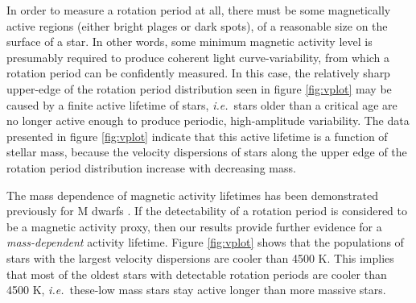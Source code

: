 \documentclass{aastex63}
\newcommand{\ie}{{\it i.e.}}
\newcommand{\eg}{{\it e.g.}}
\newcommand{\kepler}{{\it Kepler}}
\newcommand{\racomment}[1]{{\color{blue}#1}}
\begin{document}
\racomment{
In order to measure a rotation period at all, there must be some magnetically
active regions (either bright plages or dark spots), of a reasonable size on
the surface of a star.
In other words, some minimum magnetic activity level is presumably required to
produce coherent light curve-variability, from which a rotation period can be
confidently measured.
In this case, the relatively sharp upper-edge of the rotation period
distribution seen in figure \ref{fig:vplot} may be caused by a finite active
lifetime of stars, \ie\ stars older than a critical age are no longer active
enough to produce periodic, high-amplitude variability.
The data presented in figure \ref{fig:vplot} indicate that this active
lifetime is a function of stellar mass, because the velocity dispersions of
stars along the upper edge of the rotation period distribution increase with
decreasing mass.

The mass dependence of magnetic activity lifetimes has been demonstrated
previously \racomment{for M dwarfs} \citep[\eg][]{west2008, newton2017,
kiman2019}.
If the detectability of a rotation period is considered to be a magnetic
activity proxy, then our results provide further evidence for a {\it
mass-dependent} activity lifetime.
Figure \ref{fig:vplot} shows that the populations of stars with the largest
velocity dispersions are cooler than 4500 K.
This implies that \racomment{most of} the oldest stars with detectable
rotation periods are cooler than 4500 K, \ie\ these-low mass stars stay active
longer than more massive stars.
}
\end{document}
